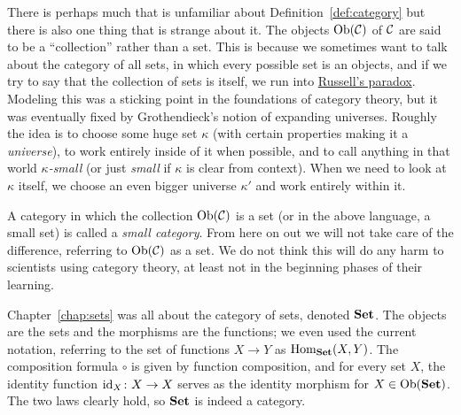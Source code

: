 \documentclass[CT4S-EN-RU]{subfiles}
\begin{document}
\begin{definitionRUS}\label{def:category}
\end{definitionRUS}

\begin{remarkENG}\label{rmk:small}
There is perhaps much that is unfamiliar about Definition~\ref{def:category} but there is also one thing that is strange about it. The objects $\textnormal{Ob}(\mathcal{C})$ of $\mathcal{C}$ are said to be a “collection” rather than a set. This is because we sometimes want to talk about the category of all sets, in which every possible set is an objects, and if we try to say that the collection of sets is itself, we run into \href{http://en.wikipedia.org/wiki/Russell's_paradox}{\text Russell's paradox}. Modeling this was a sticking point in the foundations of category theory, but it was eventually fixed by Grothendieck's notion of expanding universes. Roughly the idea is to choose some huge set $\kappa$ (with certain properties making it a {\em universe}), to work entirely inside of it when possible, and to call anything in that world {\em $\kappa$-small} (or just {\em small} if $\kappa$ is clear from context). When we need to look at $\kappa$ itself, we  choose an even bigger universe $\kappa'$ and work entirely within it.

A category in which the collection $\textnormal{Ob}(\mathcal{C})$ is a set (or in the above language, a small set) is called a {\em small category}. From here on out we will not take care of the difference, referring to $\textnormal{Ob}(\mathcal{C})$ as a set. We do not think this will do any harm to scientists using category theory, at least not in the beginning phases of their learning.
\end{remarkENG}

\begin{remarkRUS}\label{rmk:small}
\end{remarkRUS}

\begin{exampleENG}
Chapter~\ref{chap:sets} was all about the category of sets, denoted ${\mathbf{Set}}$. The objects are the sets and the morphisms are the functions; we even used the current notation, referring to the set of functions $X\to Y$ as $\textnormal{Hom}_{\mathbf{Set}}(X,Y)$. The composition formula $\circ$ is given by function composition, and for every set $X$, the identity function $\textnormal{id}_X\colon X\rightarrow X$ serves as the identity morphism for $X\in\textnormal{Ob}({\mathbf{Set}})$. The two laws clearly hold, so ${\mathbf{Set}}$ is indeed a category. 
\end{exampleENG}
\end{document}

